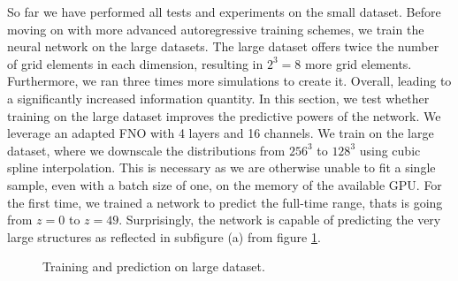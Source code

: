\documentclass{article}
\begin{document}
So far we have performed all tests and experiments on the small dataset. Before moving on with more advanced autoregressive training schemes, we train the neural network on the large datasets. The large dataset offers twice the number of grid elements in each dimension, resulting in $2^3 = 8$ more grid elements. Furthermore, we ran three times more simulations to create it. Overall, leading to a significantly increased information quantity. In this section, we test whether training on the large dataset improves the predictive powers of the network. We leverage an adapted FNO with 4 layers and 16 channels. We train on the large dataset, where we downscale the distributions from $256^3$ to $128^3$ using cubic spline interpolation. This is necessary as we are otherwise unable to fit a single sample, even with a batch size of one, on the memory of the available GPU.  For the first time, we trained a network to predict the full-time range, thats is going from $z=0$ to $z=49$. Surprisingly, the network is capable of predicting the very large structures as reflected in subfigure (a) from figure \ref{fig:large}.

\begin{figure}[h]
\centering
{}
\hfill
{}

\caption{Training and prediction on large dataset.}
\label{fig:large}
\end{figure}
\end{document}
